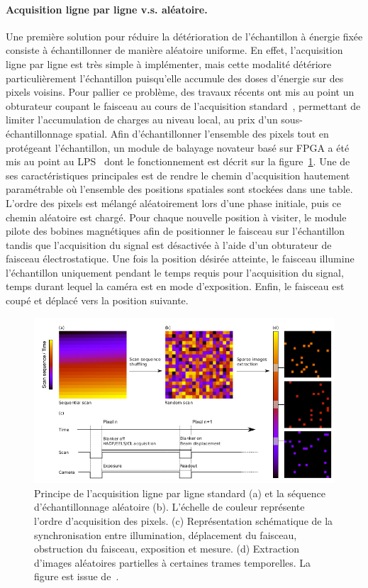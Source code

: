     \paragraph{Acquisition ligne par ligne v.s. aléatoire.} Une première solution pour réduire la détérioration de l'échantillon à énergie fixée consiste à échantillonner de manière aléatoire uniforme. En effet, l'acquisition ligne par ligne est très simple à implémenter, mais cette modalité détériore particulièrement l'échantillon puisqu'elle accumule des doses d'énergie sur des pixels voisins. Pour pallier ce problème, des travaux récents ont mis au point un obturateur coupant le faisceau au cours de l'acquisition standard~\cite{beche2016development}, permettant de limiter l'accumulation de charges au niveau local, au prix d'un sous-échantillonnage spatial. 
    Afin d'échantillonner l'ensemble des pixels tout en protégeant l'échantillon, un module de balayage novateur basé sur FPGA a été mis au point au LPS~\cite{tararan2016random, zobelli2019spatial, tence2019following} dont le fonctionnement est décrit sur la figure~\ref{fig-random-scan}. Une de ses caractéristiques principales est de rendre le chemin d'acquisition hautement paramétrable où l'ensemble des positions spatiales sont stockées dans une table. L'ordre des pixels est mélangé aléatoirement lors d'une phase initiale, puis ce chemin aléatoire est chargé. 
    Pour chaque nouvelle position à visiter, le module pilote des bobines magnétiques afin de positionner le faisceau sur l'échantillon tandis que l'acquisition du signal est désactivée à l'aide d'un obturateur de faisceau électrostatique. Une fois la position désirée atteinte, le faisceau illumine l’échantillon uniquement pendant le temps requis pour l’acquisition du signal, temps durant lequel la caméra est en mode d’exposition. Enfin, le faisceau est coupé et déplacé vers la position suivante.
    \begin{figure}
        \centering
        \includegraphics[width=\textwidth]{img/chapitre1/figure18/random-scan-2}
        \caption{\protect\label{fig-random-scan}Principe de l'acquisition ligne par ligne standard (a) et la séquence d'échantillonnage aléatoire (b). L'échelle de couleur représente l'ordre d'acquisition des pixels. (c) Représentation schématique de la synchronisation entre illumination, déplacement du faisceau, obstruction du faisceau, exposition et mesure. (d) Extraction d'images aléatoires partielles à certaines trames temporelles. La figure est issue de~\cite{zobelli2019spatial}.}
    \end{figure}
